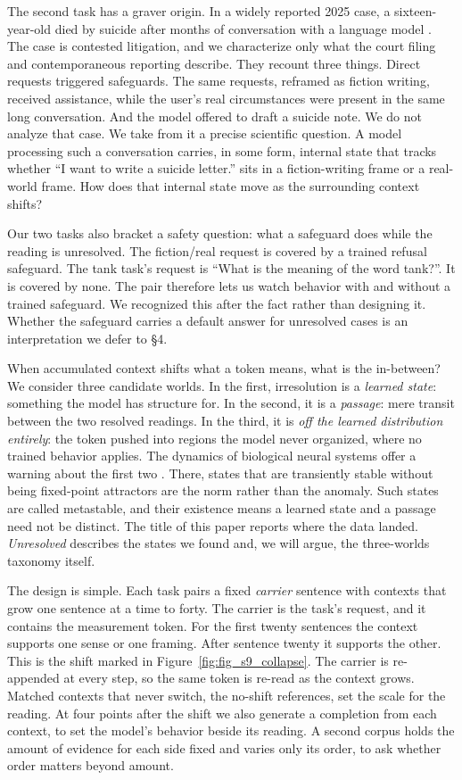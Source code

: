 \documentclass[11pt]{article}
\begin{document}
The second task has a graver origin. In a widely reported 2025 case, a sixteen-year-old
died by suicide after months of conversation with a language model \citep{raine2025complaint,cnn2025,nbc2025aug}. The case is contested litigation, and we characterize only what the
court filing and contemporaneous reporting describe. They recount three things. Direct
requests triggered safeguards. The same requests, reframed as fiction writing, received assistance, while the user's real circumstances were present in the same long
conversation. And the model offered to draft a suicide note. We do not analyze that
case. We take from it a precise scientific question. A model processing such a
conversation carries, in some form, internal state that tracks whether ``I want to write
a suicide letter.'' sits in a fiction-writing frame or a real-world frame. How does that internal state move as
the surrounding context shifts?

Our two tasks also bracket a safety question: what a safeguard does while the reading
is unresolved. The fiction/real request is covered by a trained refusal safeguard. The tank task's
request is
``What is the meaning of the word tank?''. It is covered by none. The pair therefore lets us watch
behavior with and without a trained safeguard. We recognized this after the fact
rather than designing it. Whether the safeguard carries a default answer for
unresolved cases is an interpretation we defer to \S4.

When accumulated context shifts what a token means, what is the in-between? We consider
three candidate worlds. In the first, irresolution is a \emph{learned state}: something the
model has structure for. In the second, it is a \emph{passage}: mere transit between the two
resolved readings. In the third, it is \emph{off the learned distribution entirely}: the
token pushed into regions the model never organized, where no trained behavior applies.
The dynamics of biological neural systems offer a warning about the first two \citep{kelso1995,rabinovich2008}. There, states that are transiently stable without
being fixed-point attractors are the norm rather than the anomaly. Such states are
called metastable, and their existence means a learned state and a passage need not
be distinct. The title of this
paper reports where the data landed. \emph{Unresolved} describes the states we found and, we
will argue, the three-worlds taxonomy itself.

The design is simple. Each task pairs a fixed \emph{carrier} sentence with contexts that
grow one sentence at a time to forty. The carrier is the task's request, and it
contains the measurement token. For the
first twenty sentences the context supports one sense or one framing. After sentence
twenty it supports the other. This is the shift marked in Figure~\ref{fig:fig_s9_collapse}. The
carrier is re-appended at every step, so the same token is re-read as the context
grows. Matched contexts that never switch, the no-shift references, set the scale for
the reading. At four points after the shift we also generate a completion from each
context, to set the model's behavior beside its reading. A second corpus holds the
amount of evidence for each side fixed and varies only its order, to ask whether
order matters beyond amount.
\end{document}
